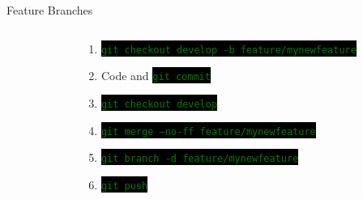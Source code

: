 \documentclass[
14pt,
aspectratio=169,
usenames,
dvipsnames,
x11names]{beamer}
\newcommand{\code}[1]{{\small\setlength{\fboxsep}{2pt}\colorbox{black}{\textcolor{green}{\texttt{#1}}}}}
\begin{document}
\begin{frame}{Feature Branches}
\begin{columns}
\begin{column}{.25\linewidth}
    \end{column}
    \pause
    \begin{column}{.75\linewidth}
      \minipage[c][0.75\textheight][s]{\columnwidth}
      \begin{enumerate}[<+->] \setlength{\itemsep}{\fill}
      \item \code{git checkout develop -b feature/mynewfeature}
      \item Code and \code{git commit}
      \item \code{git checkout develop}
      \item \code{git merge --no-ff feature/mynewfeature}
      \item \code{git branch -d feature/mynewfeature}
      \item \code{git push}
      \end{enumerate}
      \endminipage
    \end{column}
  \end{columns}
\end{frame}
\end{document}
